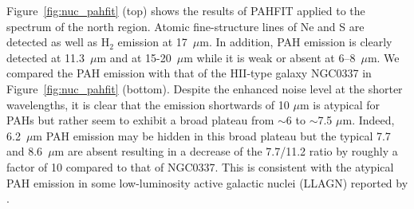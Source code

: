 Figure~\ref{fig:nuc_pahfit} (top) shows the results of PAHFIT applied to the spectrum of the north region. Atomic fine-structure lines of Ne and S are detected as well as H$_2$ emission at 17~$\mu$m. In addition, PAH emission is clearly detected at 11.3~$\mu$m and at 15-20~$\mu$m while it is weak or absent at 6--8~$\mu$m. We compared the PAH emission with that of the HII-type galaxy NGC0337 in Figure~\ref{fig:nuc_pahfit} (bottom). Despite the enhanced noise level at the shorter wavelengths, it is clear that the emission shortwards of 10 $\mu$m is atypical for PAHs but rather seem to exhibit a broad plateau from $\sim$6 to $\sim$7.5 $\mu$m. Indeed, 6.2~$\mu$m  PAH emission may be hidden in this broad plateau but the typical 7.7 and 8.6~$\mu$m are absent resulting in a decrease of the 7.7/11.2 ratio by roughly a factor of 10 compared to that of NGC0337. This is consistent with the atypical PAH emission in some low-luminosity active galactic nuclei (LLAGN) reported by \citet{Smith:2007lr}.

%
%
%


